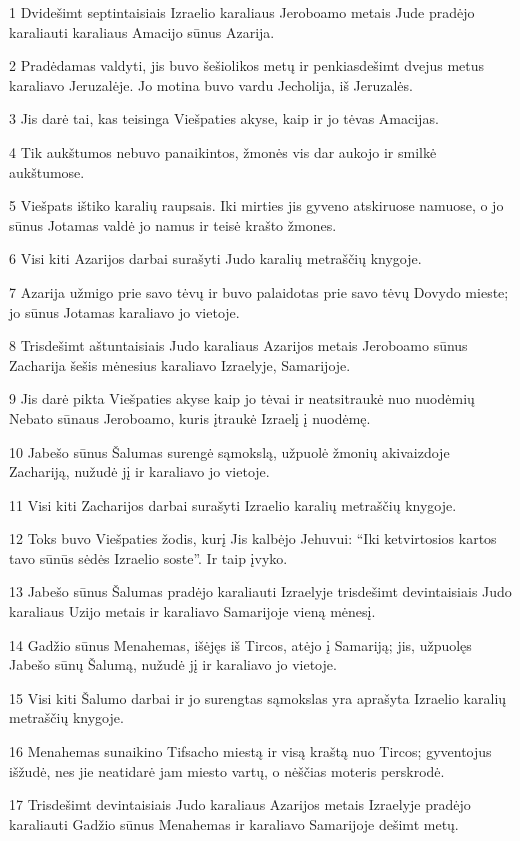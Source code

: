 \par 1 Dvidešimt septintaisiais Izraelio karaliaus Jeroboamo metais Jude pradėjo karaliauti karaliaus Amacijo sūnus Azarija. 
\par 2 Pradėdamas valdyti, jis buvo šešiolikos metų ir penkiasdešimt dvejus metus karaliavo Jeruzalėje. Jo motina buvo vardu Jecholija, iš Jeruzalės. 
\par 3 Jis darė tai, kas teisinga Viešpaties akyse, kaip ir jo tėvas Amacijas. 
\par 4 Tik aukštumos nebuvo panaikintos, žmonės vis dar aukojo ir smilkė aukštumose. 
\par 5 Viešpats ištiko karalių raupsais. Iki mirties jis gyveno atskiruose namuose, o jo sūnus Jotamas valdė jo namus ir teisė krašto žmones. 
\par 6 Visi kiti Azarijos darbai surašyti Judo karalių metraščių knygoje. 
\par 7 Azarija užmigo prie savo tėvų ir buvo palaidotas prie savo tėvų Dovydo mieste; jo sūnus Jotamas karaliavo jo vietoje. 
\par 8 Trisdešimt aštuntaisiais Judo karaliaus Azarijos metais Jeroboamo sūnus Zacharija šešis mėnesius karaliavo Izraelyje, Samarijoje. 
\par 9 Jis darė pikta Viešpaties akyse kaip jo tėvai ir neatsitraukė nuo nuodėmių Nebato sūnaus Jeroboamo, kuris įtraukė Izraelį į nuodėmę. 
\par 10 Jabešo sūnus Šalumas surengė sąmokslą, užpuolė žmonių akivaizdoje Zachariją, nužudė jį ir karaliavo jo vietoje. 
\par 11 Visi kiti Zacharijos darbai surašyti Izraelio karalių metraščių knygoje. 
\par 12 Toks buvo Viešpaties žodis, kurį Jis kalbėjo Jehuvui: “Iki ketvirtosios kartos tavo sūnūs sėdės Izraelio soste”. Ir taip įvyko. 
\par 13 Jabešo sūnus Šalumas pradėjo karaliauti Izraelyje trisdešimt devintaisiais Judo karaliaus Uzijo metais ir karaliavo Samarijoje vieną mėnesį. 
\par 14 Gadžio sūnus Menahemas, išėjęs iš Tircos, atėjo į Samariją; jis, užpuolęs Jabešo sūnų Šalumą, nužudė jį ir karaliavo jo vietoje. 
\par 15 Visi kiti Šalumo darbai ir jo surengtas sąmokslas yra aprašyta Izraelio karalių metraščių knygoje. 
\par 16 Menahemas sunaikino Tifsacho miestą ir visą kraštą nuo Tircos; gyventojus išžudė, nes jie neatidarė jam miesto vartų, o nėščias moteris perskrodė. 
\par 17 Trisdešimt devintaisiais Judo karaliaus Azarijos metais Izraelyje pradėjo karaliauti Gadžio sūnus Menahemas ir karaliavo Samarijoje dešimt metų. 
